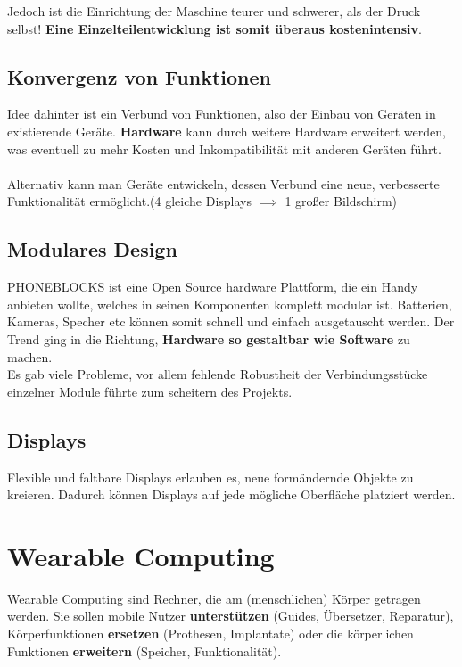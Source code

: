 \documentclass[a4paper]{article}
\begin{document}
Jedoch ist die Einrichtung der Maschine teurer und schwerer, als der Druck selbst! \textbf{Eine Einzelteilentwicklung ist somit überaus kostenintensiv}.

\subsection{Konvergenz von Funktionen}
Idee dahinter ist ein Verbund von Funktionen, also der Einbau von Geräten in existierende Geräte. \textbf{Hardware} kann durch weitere Hardware erweitert werden, was eventuell zu mehr Kosten und Inkompatibilität mit anderen Geräten führt.\\
\\
Alternativ kann man Geräte entwickeln, dessen Verbund eine neue, verbesserte Funktionalität ermöglicht.(4 gleiche Displays $\implies$ 1 großer Bildschirm)  

\subsection{Modulares Design}
PHONEBLOCKS ist eine Open Source hardware Plattform, die ein Handy anbieten wollte, welches in seinen Komponenten komplett modular ist. Batterien, Kameras, Specher etc können somit schnell und einfach ausgetauscht werden. Der Trend ging in die Richtung, \textbf{Hardware so gestaltbar wie Software} zu machen. \\

Es gab viele Probleme, vor allem fehlende Robustheit der Verbindungsstücke einzelner Module führte zum scheitern des Projekts.

\subsection{Displays}
Flexible und faltbare Displays erlauben es, neue formändernde Objekte zu kreieren. Dadurch können Displays auf jede mögliche Oberfläche platziert werden. 

\newpage
\section{Wearable Computing}
Wearable Computing sind Rechner, die am (menschlichen) Körper getragen werden. Sie sollen mobile Nutzer \textbf{unterstützen} (Guides, Übersetzer, Reparatur), Körperfunktionen \textbf{ersetzen} (Prothesen, Implantate) oder die körperlichen Funktionen \textbf{erweitern} (Speicher, Funktionalität).\\
\end{document}
